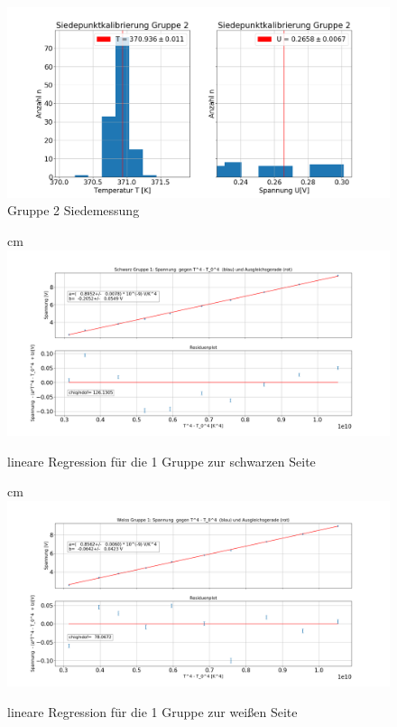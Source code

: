 \documentclass[a4paper, 11pt]{article}
\begin{document}
\begin{center}
\begin{figure}[H]
	\includegraphics[scale=0.4]{Bilder/Gruppe2_kochendesWasser.png}%
	\caption[Gruppe 2 Siedemessung]{Gruppe 2 Siedemessung}%
	\label{pic:Abbildung 2}%
\end{figure}

\begin{figure}[H]
	 cm
	\includegraphics[scale=0.42]{Bilder/Gruppe1_Schwarz.png}%
	\caption[lineare Regression für die 1 Gruppe zur schwarzen Seite]{lineare Regression für die 1 Gruppe zur schwarzen Seite}%
	\label{pic:Abbildung 2}%
	
\end{figure}

\begin{figure}[H]
	 cm
	\includegraphics[scale=0.42]{Bilder/Gruppe1_Weiss.png}%
	\caption[lineare Regression für die 1 Gruppe zur weißen Seite]{lineare Regression für die 1 Gruppe zur weißen Seite}%
	\label{pic:Abbildung 2}%
\end{figure}


\end{center}
\end{document}
